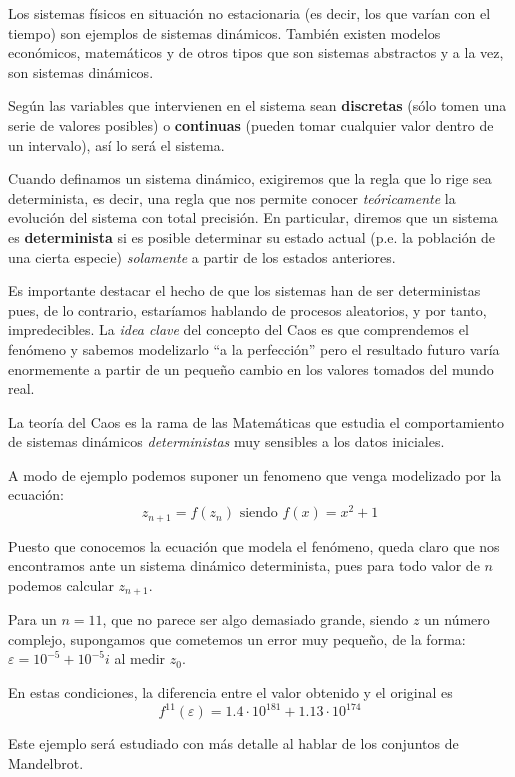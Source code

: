 Los sistemas físicos en situación no estacionaria (es decir, los que varían con el tiempo) son ejemplos de sistemas dinámicos. También existen modelos económicos, matemáticos y de otros tipos que son sistemas abstractos y a la vez, son sistemas dinámicos.

Según las variables que intervienen en el sistema sean \textbf{discretas} (sólo tomen una serie de valores posibles) o \textbf{continuas} (pueden tomar cualquier valor dentro de un intervalo), así lo será el sistema.

Cuando definamos un sistema dinámico, exigiremos que la regla que lo rige sea determinista, es decir, una regla que nos permite conocer \emph{teóricamente} la evolución del sistema con total precisión. En particular, diremos que un sistema es \textbf{determinista} si es posible determinar su estado actual (p.e. la población de una cierta especie) \emph{solamente} a partir de los estados anteriores.

Es importante destacar el hecho de que los sistemas han de ser deterministas pues, de lo contrario, estaríamos hablando de procesos aleatorios, y por tanto, impredecibles. La \emph{idea clave} del concepto del Caos es que comprendemos el fenómeno y sabemos modelizarlo ``a la perfección'' pero el resultado futuro varía enormemente a partir de un pequeño cambio en los valores tomados del mundo real.


\begin{definition}
La teoría del Caos es la rama de las Matemáticas que estudia el comportamiento de sistemas dinámicos \emph{deterministas} muy sensibles a los datos iniciales.
\end{definition}

\begin{example}\label{example:Julia}
A modo de ejemplo podemos suponer un fenomeno que venga modelizado por la ecuación:
\[z_{n+1} = f(z_n) \text{ siendo } f(x) = x^2+1\]

Puesto que conocemos la ecuación que modela el fenómeno, queda claro que nos encontramos ante un sistema dinámico determinista, pues para todo valor de $n$ podemos calcular $z_{n+1}$.

Para un $n=11$, que no parece ser algo demasiado grande, siendo $z$ un número complejo, supongamos que cometemos un error muy pequeño, de la forma: $ε=10^{-5}+10^{-5}i$ al medir $z_0$.

En estas condiciones, la diferencia entre el valor obtenido y el original es
\[f^{11}(ε)=1.4 \cdot 10^{181} + 1.13\cdot 10^{174}\]

Este ejemplo será estudiado con más detalle al hablar de los conjuntos de Mandelbrot.
\end{example}

